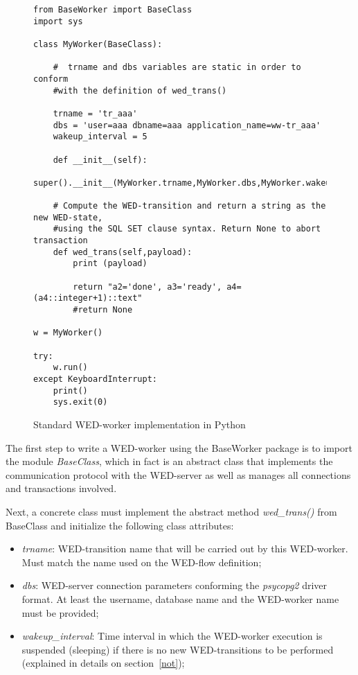 \documentclass[12pt]{article}
\begin{document}
\begin{figure}[!t]
\begin{Verbatim}[fontsize=\tiny]
from BaseWorker import BaseClass
import sys

class MyWorker(BaseClass):
    
    #  trname and dbs variables are static in order to conform 
    #with the definition of wed_trans()
        
    trname = 'tr_aaa'
    dbs = 'user=aaa dbname=aaa application_name=ww-tr_aaa'
    wakeup_interval = 5
    
    def __init__(self):
        super().__init__(MyWorker.trname,MyWorker.dbs,MyWorker.wakeup_interval)
    
    # Compute the WED-transition and return a string as the new WED-state, 
    #using the SQL SET clause syntax. Return None to abort transaction
    def wed_trans(self,payload):
        print (payload)
        
        return "a2='done', a3='ready', a4=(a4::integer+1)::text"
        #return None
        
w = MyWorker()

try:
    w.run()
except KeyboardInterrupt:
    print()
    sys.exit(0)
\end{Verbatim}
\caption{Standard WED-worker implementation in Python}
\label{fig_ww}
\end{figure}
The first step to write a WED-worker using the BaseWorker package is to import the module \emph{BaseClass}, which in fact
is an abstract class that implements the communication protocol with the WED-server as well as manages all connections
and transactions involved.  

\par  Next, a concrete class must implement the abstract method \emph{wed\_trans()} from BaseClass and initialize the following
class attributes: 
\begin{itemize}
\item \emph{trname}: WED-transition name that will be carried out by this WED-worker. Must match the name used on the WED-flow definition;
\item \emph{dbs}: WED-server connection parameters conforming the \emph{psycopg2} driver format. At least the username, database name and
                 the WED-worker name must be provided;
\item \emph{wakeup\_interval}: Time interval in which the WED-worker execution is suspended (sleeping) if there is no new WED-transitions
                              to be performed (explained in details on section~\ref{not}); 
\end{itemize}
\end{document}
